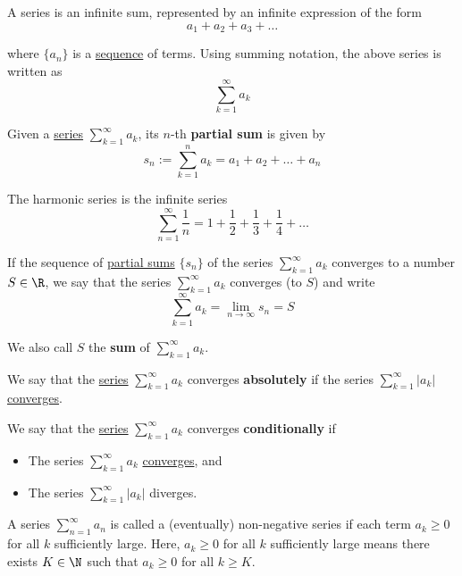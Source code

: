 \label{d659804}

A series is an infinite sum, represented by an infinite expression of the form
$$
  a_1+a_2+a_3+\ldots
$$

where $\{a_n\}$ is a \href{b5fa0e4}{sequence} of terms. Using summing notation,
the above series is written as
$$
  \sum_{k=1}^\infty a_k
$$

\label{a835138}

Given a \href{d659804}{series} $\displaystyle\sum_{k=1}^\infty a_k$, its $n$-th
\textbf{partial sum} is given by
$$
  s_n:=\sum_{k=1}^na_k=a_1+a_2+\ldots+a_n
$$

\label{c9bddda}

The harmonic series is the infinite series
$$
  \sum_{n=1}^\infty\frac1n=1+\frac12+\frac13+\frac14+\ldots
$$

\label{f8901df}

If the sequence of \href{a835138}{partial sums} $\{s_n\}$ of the series
$\sum_{k=1}^\infty a_k$ converges to a number $S\in\R$, we say that the series
$\sum_{k=1}^\infty a_k$ converges (to $S$) and write
$$
  \sum_{k=1}^\infty a_k=\lim_{n\to\infty}s_n=S
$$

We also call $S$ the \textbf{sum} of $\sum_{k=1}^\infty a_k$.

\label{f823d65}

We say that the \href{d659804}{series} $\sum_{k=1}^\infty a_k$ converges
\textbf{absolutely} if the series $\sum_{k=1}^\infty|a_k|$
\href{f8901df}{converges}.

\label{bc12578}

We say that the \href{d659804}{series} $\sum_{k=1}^\infty a_k$ converges
\textbf{conditionally} if
\begin{itemize}
  \item The series $\sum_{k=1}^\infty a_k$ \href{f8901df}{converges}, and
  \item The series $\sum_{k=1}^\infty|a_k|$ diverges.
\end{itemize}

\label{b6cffeb}

A series $\sum_{n=1}^\infty a_n$ is called a (eventually) non-negative series
if each term $a_k\geq0$ for all $k$ sufficiently large. Here, $a_k\geq0$ for
all $k$ sufficiently large means there exists $K\in\N$ such that $a_k\geq0$ for
all $k\geq K$.


